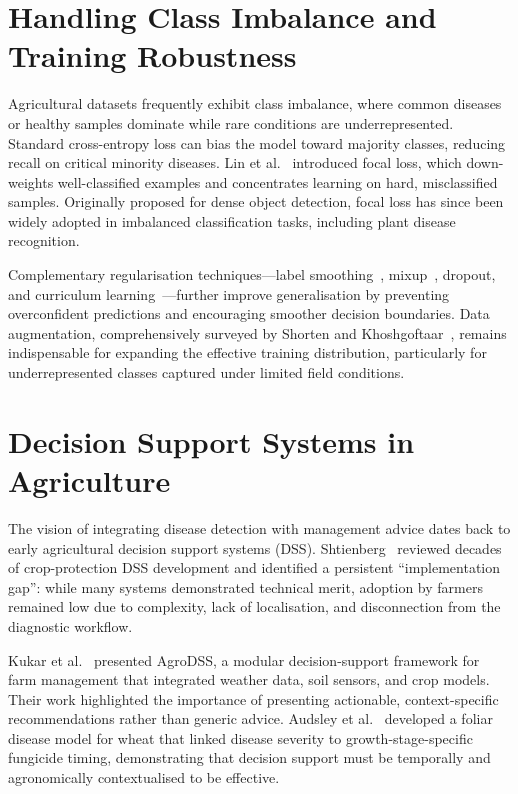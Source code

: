 \documentclass[12pt,a4paper]{report}
\begin{document}
\section{Handling Class Imbalance and Training Robustness}
Agricultural datasets frequently exhibit class imbalance, where common diseases or healthy samples dominate while rare conditions are underrepresented. Standard cross-entropy loss can bias the model toward majority classes, reducing recall on critical minority diseases. Lin et al.~\cite{b2} introduced focal loss, which down-weights well-classified examples and concentrates learning on hard, misclassified samples. Originally proposed for dense object detection, focal loss has since been widely adopted in imbalanced classification tasks, including plant disease recognition.

Complementary regularisation techniques---label smoothing~\cite{b18}, mixup~\cite{b22}, dropout, and curriculum learning~\cite{b23}---further improve generalisation by preventing overconfident predictions and encouraging smoother decision boundaries. Data augmentation, comprehensively surveyed by Shorten and Khoshgoftaar~\cite{b17}, remains indispensable for expanding the effective training distribution, particularly for underrepresented classes captured under limited field conditions.

\section{Decision Support Systems in Agriculture}
The vision of integrating disease detection with management advice dates back to early agricultural decision support systems (DSS). Shtienberg~\cite{b19} reviewed decades of crop-protection DSS development and identified a persistent ``implementation gap'': while many systems demonstrated technical merit, adoption by farmers remained low due to complexity, lack of localisation, and disconnection from the diagnostic workflow.

Kukar et al.~\cite{b20} presented AgroDSS, a modular decision-support framework for farm management that integrated weather data, soil sensors, and crop models. Their work highlighted the importance of presenting actionable, context-specific recommendations rather than generic advice. Audsley et al.~\cite{b24} developed a foliar disease model for wheat that linked disease severity to growth-stage-specific fungicide timing, demonstrating that decision support must be temporally and agronomically contextualised to be effective.
\end{document}
